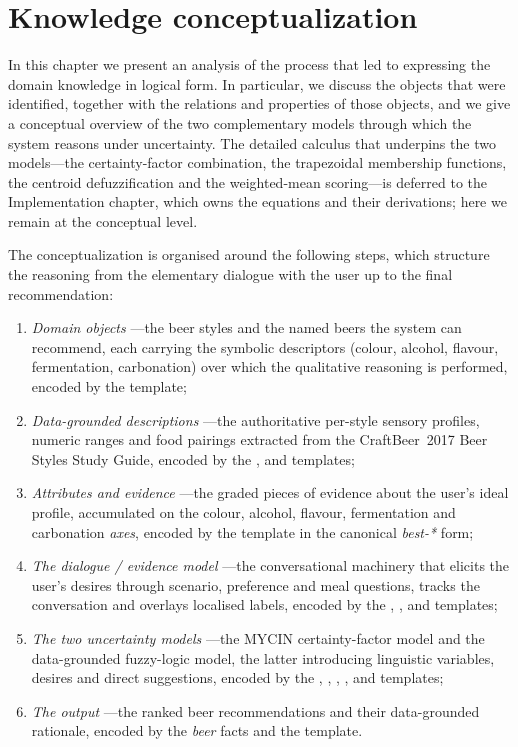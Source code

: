 \chapter{Knowledge conceptualization}

In this chapter we present an analysis of the process that led to expressing the
domain knowledge in logical form. In particular, we discuss the objects that were
identified, together with the relations and properties of those objects, and we
give a conceptual overview of the two complementary models through which the
system reasons under uncertainty. The detailed calculus that underpins the two
models---the certainty-factor combination, the trapezoidal membership functions,
the centroid defuzzification and the weighted-mean scoring---is deferred to the
Implementation chapter, which owns the equations and their derivations; here we
remain at the conceptual level.

The conceptualization is organised around the following steps, which structure
the reasoning from the elementary dialogue with the user up to the final
recommendation:

\begin{enumerate}[label=(\Roman*)]
    \item \emph{Domain objects} ---the beer styles and the named beers the system
    can recommend, each carrying the symbolic descriptors (colour, alcohol,
    flavour, fermentation, carbonation) over which the qualitative reasoning is
    performed, encoded by the  template;
    \item \emph{Data-grounded descriptions} ---the authoritative per-style sensory
    profiles, numeric ranges and food pairings extracted from the CraftBeer~2017
    Beer Styles Study Guide, encoded by the ,
     and  templates;
    \item \emph{Attributes and evidence} ---the graded pieces of evidence about
    the user's ideal profile, accumulated on the colour, alcohol, flavour,
    fermentation and carbonation \emph{axes}, encoded by the 
    template in the canonical \emph{best-*} form;
    \item \emph{The dialogue / evidence model} ---the conversational machinery
    that elicits the user's desires through scenario, preference and meal
    questions, tracks the conversation and overlays localised labels, encoded by
    the , ,  and
     templates;
    \item \emph{The two uncertainty models} ---the MYCIN certainty-factor model
    and the data-grounded fuzzy-logic model, the latter introducing linguistic
    variables, desires and direct suggestions, encoded by the ,
    , , ,  and
     templates;
    \item \emph{The output} ---the ranked beer recommendations and their
    data-grounded rationale, encoded by the  \emph{beer} facts and
    the  template.
\end{enumerate}


